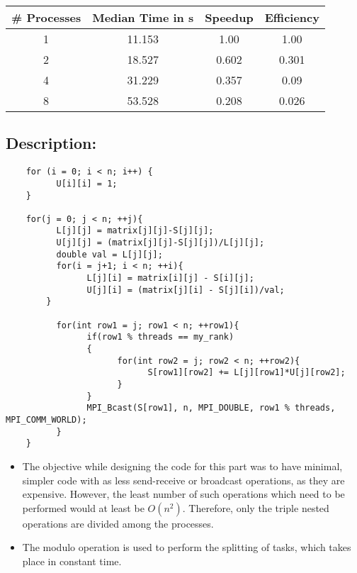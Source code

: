 \documentclass[12pt]{article}
\begin{document}
\begin{table}[H]
    \begin{center}
      \begin{tabular}{|c|c|c|c|} %
      \hline
      \textbf{\# Processes} & \textbf{Median Time in s} & \textbf{Speedup} & \textbf{Efficiency}\\
        \hline  
        1 & 11.153 & 1.00 & 1.00\\
        2 & 18.527 & 0.602 & 0.301\\
        4 & 31.229  & 0.357 & 0.09\\
        8 & 53.528 & 0.208 & 0.026\\
        \hline
      \end{tabular}
    \end{center}
  \end{table}

\subsection*{Description:}

\begin{verbatim}
	for (i = 0; i < n; i++) {
		  U[i][i] = 1;
	}

	for(j = 0; j < n; ++j){
		  L[j][j] = matrix[j][j]-S[j][j];
		  U[j][j] = (matrix[j][j]-S[j][j])/L[j][j];
		  double val = L[j][j];
		  for(i = j+1; i < n; ++i){
			    L[j][i] = matrix[i][j] - S[i][j];
			    U[j][i] = (matrix[j][i] - S[j][i])/val;
		}

		  for(int row1 = j; row1 < n; ++row1){
			    if(row1 % threads == my_rank)
			    {
				      for(int row2 = j; row2 < n; ++row2){
					        S[row1][row2] += L[j][row1]*U[j][row2];
				      }
			    }
			    MPI_Bcast(S[row1], n, MPI_DOUBLE, row1 % threads, MPI_COMM_WORLD);
		  }
	}
\end{verbatim}

\begin{itemize}
  \item The objective while designing the code for this part was to have minimal, simpler code with as less send-receive or broadcast operations, as they are expensive. However, the least number of such operations which need to be performed would at least be $O(n ^ 2)$.
  Therefore, only the triple nested operations are divided among the processes.
  \item The modulo operation is used to perform the splitting of tasks, which takes place in constant time.
\end{itemize}
\end{document}
